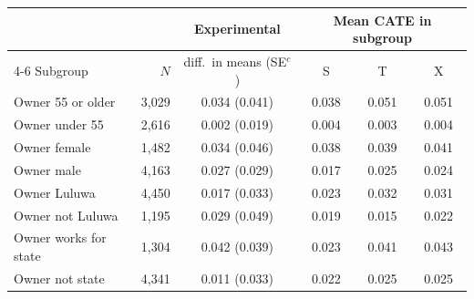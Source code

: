 \begin{tabular}{lrcccc}
\toprule
 & & Experimental & \multicolumn{3}{c}{Mean CATE in subgroup}\\
\cmidrule(lr){4-6}
Subgroup & $N$ & diff.\ in means (SE$^c$) & S & T & X\\
\midrule
Owner 55 or older & 3,029 & 0.034 (0.041) & 0.038 & 0.051 & 0.051\\
Owner under 55 & 2,616 & 0.002 (0.019) & 0.004 & 0.003 & 0.004\\
\addlinespace
Owner female & 1,482 & 0.034 (0.046) & 0.038 & 0.039 & 0.041\\
Owner male & 4,163 & 0.027 (0.029) & 0.017 & 0.025 & 0.024\\
\addlinespace
Owner Luluwa & 4,450 & 0.017 (0.033) & 0.023 & 0.032 & 0.031\\
Owner not Luluwa & 1,195 & 0.029 (0.049) & 0.019 & 0.015 & 0.022\\
\addlinespace
Owner works for state & 1,304 & 0.042 (0.039) & 0.023 & 0.041 & 0.043\\
Owner not state & 4,341 & 0.011 (0.033) & 0.022 & 0.025 & 0.025\\
\bottomrule
\end{tabular}
